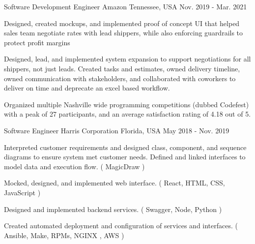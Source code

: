 \begin{cventries}
  \cventry
    {Software Development Engineer} %
    {Amazon} %
    {Tennessee, USA} %
    {Nov. 2019 - Mar. 2021} %
    {
      \begin{cvitems} %
        \item {Designed, created mockups, and implemented proof of concept UI that helped sales team negotiate rates with lead shippers, while also enforcing guardrails to protect profit margins}
        \item {Designed, lead, and implemented system expansion to support negotiations for all shippers, not just leads. Created tasks and estimates, owned delivery timeline, owned communication with stakeholders, and collaborated with coworkers to deliver on time and deprecate an excel based workflow.}
        \item {Organized multiple Nashville wide programming competitions (dubbed Codefest) with a peak of 27 participants, and an average satisfaction rating of 4.18 out of 5.}
      \end{cvitems}
    }

  \cventry
    {Software Engineer} %
    {Harris Corporation} %
    {Florida, USA} %
    {May 2018 - Nov. 2019} %
    {
      \begin{cvitems} %
        \item {Interpreted customer requirements and designed class, component, and sequence diagrams to ensure system met customer needs. Defined and linked interfaces to model data and execution flow. ( MagicDraw )}
        \item {Mocked, designed, and implemented web interface. ( React, HTML, CSS, JavaScript )}
        \item {Designed and implemented backend services. ( Swagger, Node, Python )}
        \item {Created automated deployment and configuration of services and interfaces. ( Ansible, Make, RPMs, NGINX , AWS )}
      \end{cvitems}
    }

\end{cventries}
